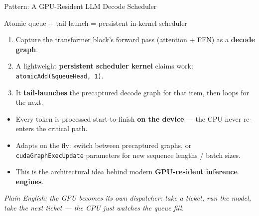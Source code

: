\documentclass[aspectratio=169]{beamer}
\newcommand{\kw}[1]{\textbf{\textcolor{kwblue}{#1}}}
\newcommand{\pe}[1]{{\footnotesize\itshape Plain English: #1}}
\begin{document}
\begin{frame}{Pattern: A GPU-Resident LLM Decode Scheduler}
  \begin{block}{Atomic queue + tail launch = persistent in-kernel scheduler}
    \begin{enumerate}\small
      \item Capture the transformer block's forward pass (attention + FFN) as a \kw{decode graph}.
      \item A lightweight \kw{persistent scheduler kernel} claims work:
            \texttt{atomicAdd(\&queueHead, 1)}.
      \item It \kw{tail-launches} the precaptured decode graph for that item, then loops for the next.
    \end{enumerate}
  \end{block}
  \begin{itemize}
    \item Every token is processed start-to-finish \kw{on the device} --- the CPU never re-enters
          the critical path.
    \item Adapts on the fly: switch between precaptured graphs, or \texttt{cudaGraphExecUpdate}
          parameters for new sequence lengths / batch sizes.
    \item This is the architectural idea behind modern \kw{GPU-resident inference engines}.
  \end{itemize}
  \medskip
  \pe{the GPU becomes its own dispatcher: take a ticket, run the model, take the next ticket --- the CPU just watches the queue fill.}
\end{frame}
\end{document}
